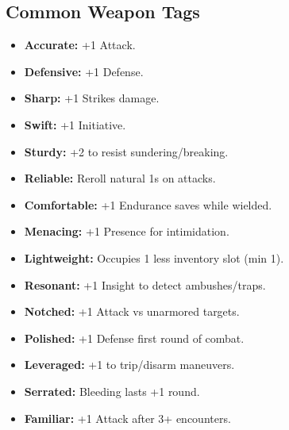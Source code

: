 \documentclass[10pt,twoside]{article}
\begin{document}

\begin{multicols}{2}
\setlength{\columnseprule}{0.4pt}
\footnotesize

\subsection{Common Weapon Tags}
\begin{itemize}[leftmargin=0.2cm, itemsep=0.02cm, parsep=0pt]
\item \textcolor{commoncolor}{\textbf{Accurate:}} +1 Attack.
\item \textcolor{commoncolor}{\textbf{Defensive:}} +1 Defense.
\item \textcolor{commoncolor}{\textbf{Sharp:}} +1 Strikes damage.
\item \textcolor{commoncolor}{\textbf{Swift:}} +1 Initiative.
\item \textcolor{commoncolor}{\textbf{Sturdy:}} +2 to resist sundering/breaking.
\item \textcolor{commoncolor}{\textbf{Reliable:}} Reroll natural 1s on attacks.
\item \textcolor{commoncolor}{\textbf{Comfortable:}} +1 Endurance saves while wielded.
\item \textcolor{commoncolor}{\textbf{Menacing:}} +1 Presence for intimidation.
\item \textcolor{commoncolor}{\textbf{Lightweight:}} Occupies 1 less inventory slot (min 1).
\item \textcolor{commoncolor}{\textbf{Resonant:}} +1 Insight to detect ambushes/traps.
\item \textcolor{commoncolor}{\textbf{Notched:}} +1 Attack vs unarmored targets.
\item \textcolor{commoncolor}{\textbf{Polished:}} +1 Defense first round of combat.
\item \textcolor{commoncolor}{\textbf{Leveraged:}} +1 to trip/disarm maneuvers.
\item \textcolor{commoncolor}{\textbf{Serrated:}} Bleeding lasts +1 round.
\item \textcolor{commoncolor}{\textbf{Familiar:}} +1 Attack after 3+ encounters.
\end{itemize}


\end{multicols}
\end{document}
